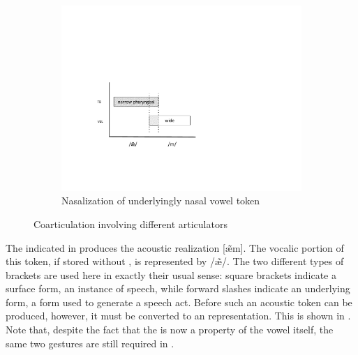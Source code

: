 \begin{figure}[H]
\begin{subfigure}[t]{.3\textwidth}
        \includegraphics[width=\linewidth]{figures/nasalization3.pdf}
        \caption{\label{fig:extra nasalization}Nasalization of underlyingly nasal vowel token}
    \end{subfigure}
    

\caption{\label{fig:Coarticulation}Coarticulation involving different articulators}
\end{figure}

The  indicated in 
produces the acoustic realization {[æ̃m]}. The vocalic
portion of this token, if stored without , is represented
by {/æ̃/}. The two different types of brackets are used
here in exactly their usual sense: square brackets indicate a surface
form, an instance of speech, while forward slashes indicate an underlying
form, a form used to generate a speech act. Before such an acoustic
token can be produced, however, it must be converted to an 
representation. This is shown in .
Note that, despite the fact that the  is now a property
of the vowel itself, the same two  gestures are still
required in .

